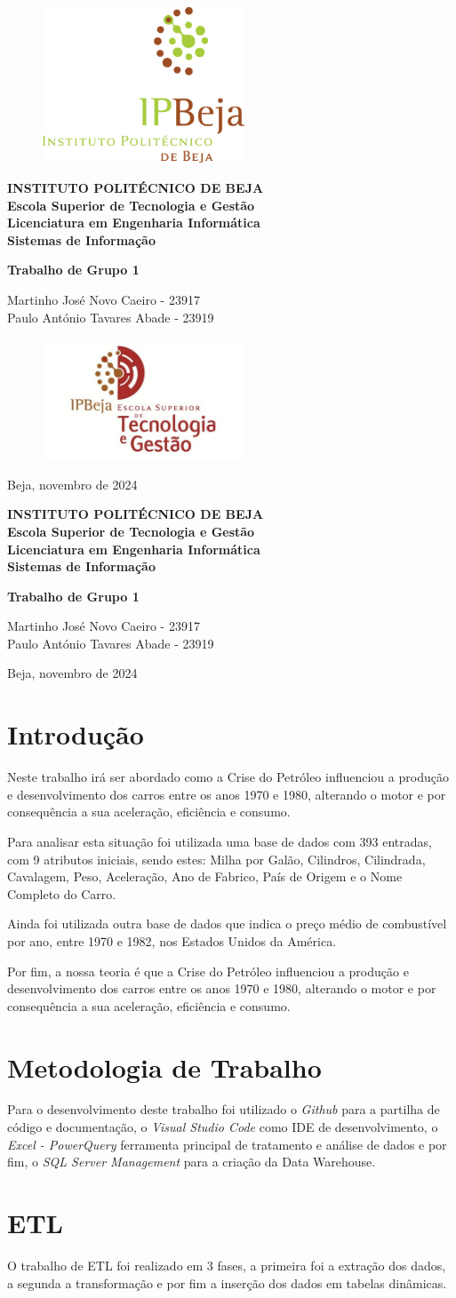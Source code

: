 \documentclass[a4paper]{article}
\newcommand{\firsttitlepage}{
    \begin{titlepage}
        \centering
        \vspace*{1cm}
        
        \begin{figure}[h!]
            \centering
            \includegraphics[width=6cm]{Recursos/LOGO_IPB} %
            \vspace{0.5cm}
        \end{figure}

        \large\textbf{INSTITUTO POLITÉCNICO DE BEJA} \\
        \large\textbf{Escola Superior de Tecnologia e Gestão} \\
        \large\textbf{Licenciatura em Engenharia Informática} \\
        \large\textbf{Sistemas de Informação} \\
        
        \vspace{2cm}
        
        {\Huge \textbf{Trabalho de Grupo 1}} \\
        
        \vspace{1.5cm}
        
        \large Martinho José Novo Caeiro - 23917 \\
        \large Paulo António Tavares Abade - 23919 \\
        
        \vfill
        
        \begin{figure}[h!]
            \centering
            \includegraphics[width=6cm]{Recursos/IPBejaESTIG.jpg} %
        \end{figure}
        
        \vspace{1cm}
        
        {\large Beja, novembro de 2024}
    \end{titlepage}
}
\newcommand{\secondtitlepage}{
    \begin{titlepage}
        \centering
        \vspace*{1cm}
        
        \large\textbf{INSTITUTO POLITÉCNICO DE BEJA} \\
        \large\textbf{Escola Superior de Tecnologia e Gestão} \\
        \large\textbf{Licenciatura em Engenharia Informática} \\
        \large\textbf{Sistemas de Informação} \\
        
        \vspace{2cm}
        
        {\Huge \textbf{Trabalho de Grupo 1}} \\
        
        \vspace{1.5cm}
        
        \large Martinho José Novo Caeiro - 23917 \\
        \large Paulo António Tavares Abade - 23919 \\
        
        \vfill
        
        {\large Beja, novembro de 2024}
    \end{titlepage}
}
\begin{document}

\firsttitlepage

\secondtitlepage
\renewcommand{\contentsname}{Índice}       %
\renewcommand{\listfigurename}{Índice de Figuras} %

\newpage
\doublespacing
\tableofcontents
\listoffigures
\doublespacing

\newpage
{}

\section{Introdução}\label{intro}
Neste trabalho irá ser abordado como a Crise do Petróleo influenciou a produção e desenvolvimento
dos carros entre os anos 1970 e 1980, alterando o motor e por consequência a sua aceleração, eficiência e consumo.

Para analisar esta situação foi utilizada uma base de dados com 393 entradas, com 9 atributos iniciais, sendo estes:
 Milha por Galão, Cilindros, Cilindrada, Cavalagem, Peso, Aceleração, Ano de Fabrico, País de Origem e o Nome Completo do Carro.

Ainda foi utilizada outra base de dados que indica o preço médio de combustível por ano, entre 1970 e 1982, 
nos Estados Unidos da América.

Por fim, a nossa teoria é que a Crise do Petróleo influenciou a produção e 
desenvolvimento dos carros entre os anos 1970 e 1980, alterando o motor e por consequência a sua aceleração, eficiência e consumo.
\section{Metodologia de Trabalho}\label{met}
Para o desenvolvimento deste trabalho foi utilizado o \textit{Github} para a partilha de código e documentação,
o \textit{Visual Studio Code} como IDE de desenvolvimento, o \textit{Excel - PowerQuery} ferramenta principal de tratamento
e análise de dados e por fim, o \textit{SQL Server Management} para a criação da Data Warehouse. 
\section{ETL}\label{etl}
O trabalho de ETL foi realizado em 3 fases, a primeira foi a extração dos dados, 
a segunda a transformação e por fim a inserção dos dados em tabelas dinâmicas.
\end{document}
